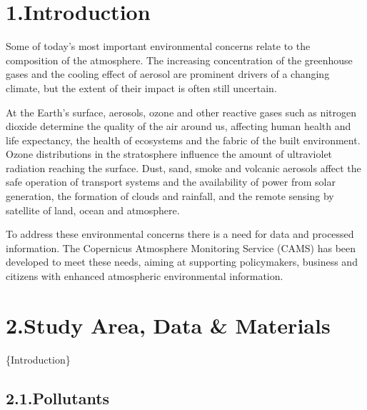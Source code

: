 \documentclass[9pt]{report}
\begin{document}
\section{1.\hspace*{0.5em}Introduction}\label{sec-introduction}%

\noindent{}Some of today’s most important environmental concerns relate to the 
composition of the atmosphere. The increasing concentration of the 
greenhouse gases and the cooling effect of aerosol are prominent 
drivers of a changing climate, but the extent of their impact is 
often still uncertain.%

At the Earth’s surface, aerosols, ozone and other reactive gases such as 
nitrogen dioxide determine the quality of the air around us, affecting 
human health and life expectancy, the health of ecosystems and the 
fabric of the built environment. Ozone distributions in the stratosphere 
influence the amount of ultraviolet radiation reaching the surface. 
Dust, sand, smoke and volcanic aerosols affect the safe operation of 
transport systems and the availability of power from solar generation, 
the formation of clouds and rainfall, and the remote sensing by satellite 
of land, ocean and atmosphere.%

To address these environmental concerns there is a need for data and 
processed information. The Copernicus Atmosphere Monitoring Service (CAMS) 
has been developed to meet these needs, aiming at supporting policymakers, 
business and citizens with enhanced atmospheric environmental information.%

\section{2.\hspace*{0.5em}Study Area, Data \& Materials}\label{sec-study-area-data-materials}%

\noindent{}\{Introduction\}%

\subsection{2.1.\hspace*{0.5em}Pollutants}\label{sec-pollutants}%
\end{document}
